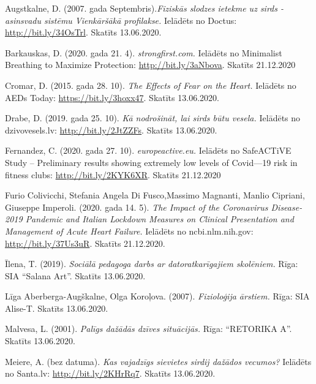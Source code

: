 \documentclass[12pt]{article}
\begin{document}
\begingroup
\renewcommand{\section}[2]{}
\begin{thebibliography}{9}
Augstkalne, D. (2007. gada Septembris).\textit{Fiziskās slodzes ietekme uz sirds - asinsvadu sistēmu Vienkāršākā profilakse.} Ielādēts no Doctus: \url{http://bit.ly/34OsTrl}. Skatīts 13.06.2020. 

Barkauskas, D. (2020. gada 21. 4). \textit{strongfirst.com.} Ielādēts no Minimalist Breathing to Maximize Protection: \url{http://bit.ly/3aNbova}. Skatīts 21.12.2020

Cromar, D. (2015. gada 28. 10). \textit{The Effects of Fear on the Heart.} Ielādēts no AEDs Today: \url{https://bit.ly/3hoxx47}. Skatīts 13.06.2020.

Drabe, D. (2019. gada 25. 10). \textit{Kā nodrošināt, lai sirds būtu vesela.} Ielādēts no dzivovesels.lv: \url{http://bit.ly/2JtZZFs}. Skatīts 13.06.2020.

Fernandez, C. (2020. gada 27. 10). \textit{europeactive.eu.} Ielādēts no SafeACTiVE Study – Preliminary results showing extremely low levels of Covid—19 risk in fitness clubs: \url{http://bit.ly/2KYK6XR}. Skatīts 21.12.2020

Furio Colivicchi, Stefania Angela Di Fusco,Massimo Magnanti, Manlio Cipriani, Giuseppe Imperoli. (2020. gada 14. 5). \textit{The Impact of the Coronavirus Disease-2019 Pandemic and Italian Lockdown Measures on Clinical Presentation and Management of Acute Heart Failure.} Ielādēts no ncbi.nlm.nih.gov: \url{http://bit.ly/37Us3uR}. Skatīts 21.12.2020.

Īlena, T. (2019). \textit{Sociālā pedagoga darbs ar datoratkarīgajiem skolēniem.} Rīga: SIA ``Salana Art''. Skatīts 13.06.2020.

Līga Aberberga-Augškalne, Olga Koroļova. (2007). \textit{Fizioloģija ārstiem.} Rīga: SIA Alise-T. Skatīts 13.06.2020.

Malvesa, L. (2001). \textit{Palīgs dažādās dzīves situācijās.} Rīga: ``RETORIKA A''. Skatīts 13.06.2020.

Meiere, A. (bez datuma). \textit{Kas vajadzīgs sievietes sirdij dažādos vecumos?} Ielādēts no Santa.lv: \url{http://bit.ly/2KHrRq7}. Skatīts 13.06.2020.


\end{thebibliography}
\end{document}
